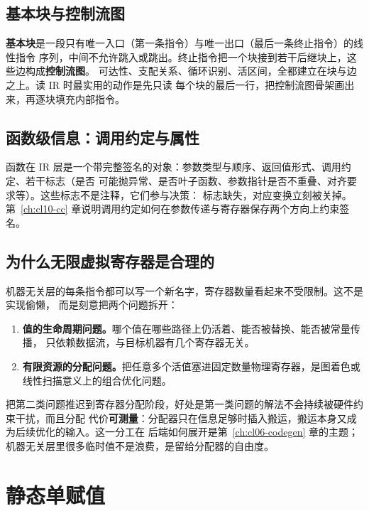 \documentclass[12pt,a4paper,fontset=fandol]{ctexbook}
\begin{document}
\subsection{基本块与控制流图}\label{sec:cl04-basic-block}

\textbf{基本块}是一段只有唯一入口（第一条指令）与唯一出口（最后一条终止指令）的线性指令
序列，中间不允许跳入或跳出。终止指令把一个块接到若干后继块上，这些边构成\textbf{控制流图}。
可达性、支配关系、循环识别、活区间，全都建立在块与边之上。读 IR 时最实用的动作是先只读
每个块的最后一行，把控制流图骨架画出来，再逐块填充内部指令。

\subsection{函数级信息：调用约定与属性}\label{sec:cl04-attrs}

函数在 IR 层是一个带完整签名的对象：参数类型与顺序、返回值形式、调用约定、若干标志（是否
可能抛异常、是否叶子函数、参数指针是否不重叠、对齐要求等）。这些标志不是注释，它们参与决策：
标志缺失，对应变换立刻被关掉。第~\ref{ch:cl10-cc} 章说明调用约定如何在参数传递与寄存器保存两个方向上约束签名。

\subsection{为什么无限虚拟寄存器是合理的}\label{sec:cl04-vregs}

机器无关层的每条指令都可以写一个新名字，寄存器数量看起来不受限制。这不是实现偷懒，
而是刻意把两个问题拆开：

\begin{enumerate}
  \item \textbf{值的生命周期问题。}哪个值在哪些路径上仍活着、能否被替换、能否被常量传播，
        只依赖数据流，与目标机器有几个寄存器无关。
  \item \textbf{有限资源的分配问题。}把任意多个活值塞进固定数量物理寄存器，是图着色或
        线性扫描意义上的组合优化问题。
\end{enumerate}

把第二类问题推迟到寄存器分配阶段，好处是第一类问题的解法不会持续被硬件约束干扰，而且分配
代价\textbf{可测量}：分配器只在信息足够时插入搬运，搬运本身又成为后续优化的输入。这一分工在
后端如何展开是第~\ref{ch:cl06-codegen} 章的主题；机器无关层里很多临时值不是浪费，是留给分配器的自由度。

\section{静态单赋值}\label{sec:cl04-ssa}
\end{document}
